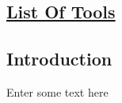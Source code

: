 
\vspace*{8.5cm}

\begin{flushright}
	\section{\huge{\underline{List Of Tools}}}
\end{flushright}

\subsection{Introduction}
	Enter some text here